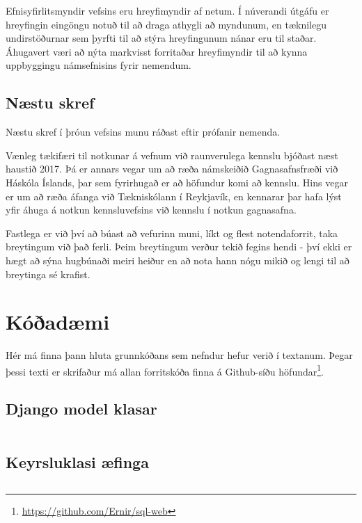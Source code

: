 \documentclass[a4paper,12pt,twoside,BCOR=10mm]{scrbook}
\begin{document}
Efnisyfirlitsmyndir vefsins eru hreyfimyndir af netum. Í núverandi útgáfu er hreyfingin eingöngu notuð til að draga athygli að myndunum, en tæknilegu undirstöðurnar sem þyrfti til að stýra hreyfingunum nánar eru til staðar. Áhugavert væri að nýta markvisst forritaðar hreyfimyndir til að kynna uppbyggingu námsefnisins fyrir nemendum.

\section{Næstu skref}
Næstu skref í þróun vefsins munu ráðast eftir prófanir nemenda. 

Vænleg tækifæri til notkunar á vefnum við raunverulega kennslu bjóðast næst haustið 2017. Þá er annars vegar um að ræða námskeiðið Gagnasafnsfræði við Háskóla Íslands, þar sem fyrirhugað er að höfundur komi að kennslu. Hins vegar er um að ræða áfanga við Tækniskólann í Reykjavík, en kennarar þar hafa lýst yfir áhuga á notkun kennsluvefsins við kennslu í notkun gagnasafna.

Fastlega er við því að búast að vefurinn muni, líkt og flest notendaforrit, taka breytingum við það ferli. Þeim breytingum verður tekið fegins hendi - því ekki er hægt að sýna hugbúnaði meiri heiður en að nota hann nógu mikið og lengi til að breytinga sé krafist.




\appendix
\renewcommand{\chaptername}{Appendix}

\chapter{Kóðadæmi}
\label{sec:code-excerpts}
Hér má finna þann hluta grunnkóðans sem nefndur hefur verið í textanum. Þegar þessi texti er skrifaður má allan forritskóða finna á Github-síðu höfundar\footnote{\url{https://github.com/Ernir/sql-web}}.
\section{Django model klasar}
\label{code:django-model-objects}
\inputminted[fontsize=\scriptsize, frame=lines, linenos=true, python3=true, label=models.py]{python}{../sql\string_web/models.py}
\section{Keyrsluklasi æfinga}
\label{code:example-runner}
\inputminted[fontsize=\scriptsize, frame=lines, linenos=true, python3=true, label=sql_runner.py]{python}{../sql\string_web/sql\string_runner.py}
\end{document}
